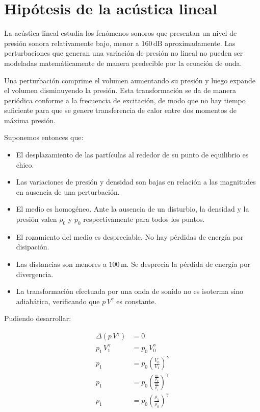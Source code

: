 \documentclass[a5paper,12pt,twoside]{book}
\begin{document}
\section{Hipótesis de la acústica lineal}
\label{sec:linAcousticHyp}

La acústica lineal estudia los fenómenos sonoros que presentan un nivel de presión sonora relativamente bajo, menor a $160\,\si{\deci\bel}$ aproximadamente. Las perturbaciones que generan una variación de presión no lineal no pueden ser modeladas matemáticamente de manera predecible por la ecuación de onda.

Una perturbación comprime el volumen aumentando su presión y luego expande el volumen disminuyendo la presión. Esta transformación se da de manera periódica conforme a la frecuencia de excitación, de modo que no hay tiempo suficiente para que se genere transferencia de calor entre dos momentos de máxima presión.

Suponemos entonces que:

\begin{itemize}
    \item El desplazamiento de las partículas al rededor de su punto de equilibrio es chico.

    \item Las variaciones de presión y densidad son bajas en relación a las magnitudes en ausencia de una perturbación.
    
    \item El medio es homogéneo. Ante la ausencia de un disturbio, la densidad y la presión valen $\rho_0$ y $p_0$ respectivamente para todos los puntos.
    
    \item El rozamiento del medio es despreciable. No hay pérdidas de energía por disipación.
    
    \item Las distancias son menores a $100\,\si{\metre}$. Se desprecia la pérdida de energía por divergencia.
    
    \item La transformación efectuada por una onda de sonido no es isoterma sino adiabática, verificando que $p\,V^\gamma$ es constante.
\end{itemize}

Pudiendo desarrollar:

\begin{align*}
    \Delta \left( p\,V^\gamma \right) &= 0
    \\
    p_1\,V_1^\gamma &= p_0\,V_0^\gamma
    \\
    p_1 &= p_0 \left(\frac{V_0}{V_1} \right)^\gamma
    \\
    p_1 &= p_0 \left( \frac{\tfrac{m}{\rho_0}}{\tfrac{m}{\rho_1}} \right)^\gamma
    \\
    p_1 &= p_0 \left( \frac{\rho_1}{\rho_0} \right)^\gamma
\end{align*}
\end{document}
